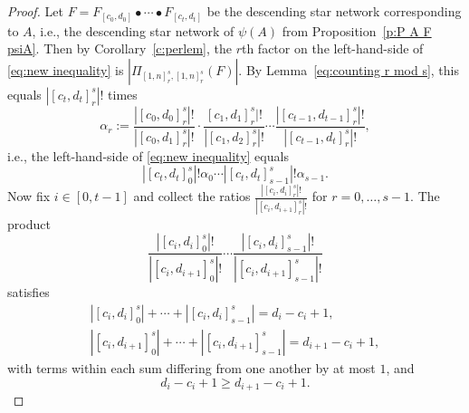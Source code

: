\documentclass[12pt]{amsart}
\theoremstyle{definition}
\numberwithin{equation}{section}
\begin{document}
\begin{proof}

    Let $F=F_{[c_0,d_0]} \bullet \cdots \bullet F_{[c_t,d_t]}$ be the descending star network corresponding to $A$, i.e., %
    the descending star network of $\psi(A)$ from Proposition~\ref{p:P A F psiA}. Then by
    Corollary~\ref{c:perlem}, the $r$th factor on the left-hand-side of \eqref{eq:new inequality} is $|\Pi_{[1,n]_r^s, [1, n]_r^s} (F)|$. By Lemma~\ref{eq:counting r mod s}, this equals $|[c_t, d_t]_r^s|!$ times
\begin{equation}
   \alpha_r:= \frac{ |[c_0,d_0]_{r}^{s}|!}{|[c_0,d_1]_{r}^{s}|!} \cdot \frac{[c_1,d_1]_{r}^{s}|!}{|[c_1,d_2]_r^s|!} \cdots \frac{|[c_{t-1},d_{t-1}]_{r}^{s}|!}{|[c_{t-1},d_{t}]_r^s|!},
\end{equation} i.e., the left-hand-side of \eqref{eq:new inequality} equals
\begin{equation}\label{eq:alphaLHS}
    |[c_t,d_t]_0^s|!\alpha_0\cdots |[c_t, d_t]_{s-1}^s|!\alpha_{s-1}.
\end{equation}
    Now fix $i\in[0,t-1]$ and collect the ratios $\frac{|[c_i, d_i]_r^s|!}{|[c_i,d_{i+1}]_r^s|!}$ for $r=0, \dotsc, s-1$. The product
    \begin{equation}\label{eq:collect ratios product s}
        \frac{ |[c_i,d_i]_{0}^{s}|!}{|[c_i,d_{i+1}]_{0}^{s}|!} \cdots \frac{|[c_{i},d_{i}]_{s-1}^{s}|!}{|[c_{i},d_{i+1}]_{s-1}^s|!}
    \end{equation}
satisfies
\begin{equation}\label{eq: cardinality sums s}
\begin{gathered}
|[c_i, d_i]_0^s|+\cdots+|[c_i, d_i]_{s-1}^s|=d_i-c_i+1,  \\ |[c_i, d_{i+1}]_0^s|+\cdots+|[c_i, d_{i+1}]_{s-1}^s|=d_{i+1}-c_i+1,
\end{gathered}
\end{equation}
with terms within each sum differing from one another by at most $1$, and \begin{equation*}d_i-c_i+1\geq d_{i+1}-c_i+1.\end{equation*}


\end{proof}
\end{document}
